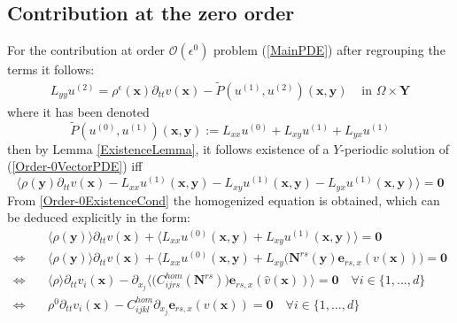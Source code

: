 \subsection{Contribution at the zero order}
For the contribution at order $\mathcal{O}(\epsilon^0)$ problem (\ref{MainPDE}) after regrouping the terms it follows:
\begin{equation}
    \label{Order-0VectorPDE}
    \begin{array}{cc}
        L_{yy} u^{(2)} = \rho^{\epsilon}(\mathbf{x})\partial_{tt} v(\mathbf{x}) - \tilde{P}(u^{(1)},u^{(2)}) (\mathbf{x},\mathbf{y}) & \text{ in } \Omega \times \mathbf{Y}
    \end{array}
\end{equation}
where it has been denoted 
\begin{equation*}
    \tilde{P}(u^{(0)}, u^{(1)}) (\mathbf{x},\mathbf{y}) :=  L_{xx} u^{(0)} + L_{xy} u^{(1)} + L_{yx} u^{(1)}
\end{equation*}
then by Lemma \ref{ExistenceLemma}, it follows existence of a $Y$-periodic solution of (\ref{Order-0VectorPDE}) iff 
\begin{equation}
    \label{Order-0ExistenceCond}
    \big \langle \rho(\mathbf{y}) \partial_{tt} v(\mathbf{x}) - L_{xx} u^{(1)} (\mathbf{x},\mathbf{y}) - L_{xy} u^{(1)}(\mathbf{x},\mathbf{y}) - L_{yx} u^{(1)}(\mathbf{x},\mathbf{y}) \big \rangle = \mathbf{0}
\end{equation}
From \ref{Order-0ExistenceCond} the homogenized equation is obtained, which can be deduced explicitly in the form:
\begin{align*}
    & \quad \langle \rho(\mathbf{y}) \rangle \partial_{tt} v(\mathbf{x}) + \langle L_{xx} u^{(0)}(\mathbf{x},\mathbf{y}) +L_{xy} u^{(1)}(\mathbf{x},\mathbf{y}) \rangle = \mathbf{0} \\
    \Leftrightarrow & \quad \langle \rho(\mathbf{y}) \rangle \partial_{tt} v(\mathbf{x}) + \langle L_{xx} u^{(0)}(\mathbf{x}, \mathbf{y}) + L_{xy}\big( \mathbf{N}^{rs}(\mathbf{y})\mathbf{e}_{rs,x}(v(\mathbf{x})) \big) = \mathbf{0} \\
    \Leftrightarrow & \quad \langle \rho\rangle \partial_{tt} v_i(\mathbf{x}) - \partial_{x_j}\big \langle \big(C_{ijrs}^{hom}(\mathbf{N}^{rs})\big) \mathbf{e}_{rs,x}(\hat{v}(\mathbf{x})) \big \rangle  = \mathbf{0} \quad \forall i \in \{1,\dots, d\}\\
    \Leftrightarrow & \quad \rho^{0} \partial_{tt} v_i(\mathbf{x}) - C_{ijkl}^{hom} \partial_{x_j} \mathbf{e}_{rs,x} (v(\mathbf{x})) = \mathbf{0} \quad \forall i \in \{1,\dots,d\}
\end{align*}
